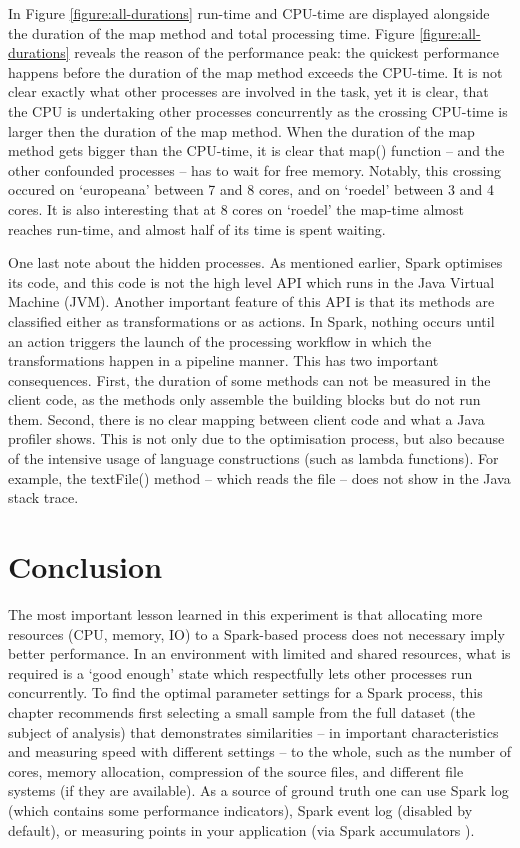 In Figure \ref{figure:all-durations} run-time and CPU-time are displayed alongside the duration of the map method and total processing time. Figure \ref{figure:all-durations} reveals the reason of the performance peak: the quickest performance happens before the duration of the map method exceeds the CPU-time. It is not clear exactly what other processes are involved in the task, yet it is clear, that the CPU is undertaking other processes concurrently as the crossing CPU-time is larger then the duration of the map method. When the duration of the map method gets bigger than the CPU-time, it is clear that map() function -- and the other confounded processes -- has to wait for free memory. Notably, this crossing occured on `europeana' between 7 and 8 cores, and on `roedel' between 3 and 4 cores. It is also interesting that at 8 cores on `roedel' the map-time almost reaches run-time, and almost half of its time is spent waiting.

One last note about the hidden processes. As mentioned earlier, Spark optimises its code, and this code is not the high level API which runs in the Java Virtual Machine (JVM). Another important feature of this API is that its methods are classified either as transformations or as actions. In Spark, nothing occurs until an action triggers the launch of the processing workflow in which the transformations happen in a pipeline manner. This has two important consequences. First, the duration of some methods can not be measured in the client code, as the methods only assemble the building blocks but do not run them. Second, there is no clear mapping between client code and what a Java profiler shows. This is not only due to the optimisation process, but also because of the intensive usage of language constructions (such as lambda functions). For example, the textFile() method -- which reads the file -- does not show in the Java stack trace.

\section{Conclusion}

The most important lesson learned in this experiment is that allocating more resources  (CPU, memory, IO) to a Spark-based process does not necessary imply better performance. In an environment with limited and shared resources, what is required is a ‘good enough’ state which respectfully lets other processes run concurrently. To find the optimal parameter settings for a Spark process, this chapter recommends first selecting a small sample from the full dataset (the subject of analysis) that demonstrates similarities -- in important characteristics and measuring speed with different settings -- to the whole, such as the number of cores, memory allocation, compression of the source files, and different file systems (if they are available). As a source of ground truth one can use Spark log (which contains some performance indicators), Spark event log (disabled by default), or measuring points in your application (via Spark accumulators \cite{spark-accumulators}).

% 
% 
